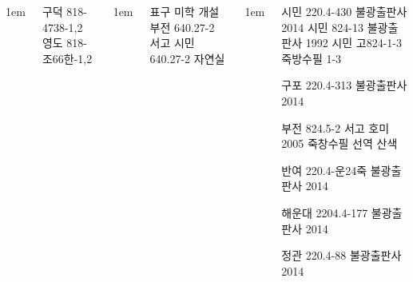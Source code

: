 \documentclass[	20pt, 
							a1paper, 
							portrait, %
							margin=0mm, %
							innermargin=10mm,  		%
							colspace=5mm, 
							subcolspace=0mm
							]{tikzposter}
\begin{document}
\begin{columns}
			{
					\setlength{\leftmargini}{7em}
					\setlength{\labelsep} {1em}
				\begin{LARGE}
구덕    818-4738-1,2   	%
영도    818-조66한-1,2 	%

				\end{LARGE}
			}


			{
					\setlength{\leftmargini}{4em}
					\setlength{\labelsep} {1em}
				\begin{LARGE}
표구 미학 개설
부전  640.27-2  서고  		%
시민  640.27-2  자연실  	%
				\end{LARGE}
			}



			{
					\setlength{\leftmargini}{4em}
					\setlength{\labelsep} {1em}
				\begin{LARGE}

시민  220.4-430  불광출판사 2014       
시민  824-13  불광출판사 1992
시민  고824-1-3  죽방수필 1-3  

구포  220.4-313  불광출판사 2014       %

부전  824.5-2  서고  호미 2005  죽창수필 선역 산색  %

반여  220.4-운24죽  불광출판사 2014  %

해운대 2204.4-177 불광출판사 2014   %

정관  220.4-88 불광출판사 2014         %

				\end{LARGE}
			}








\end{columns}
\end{document}
